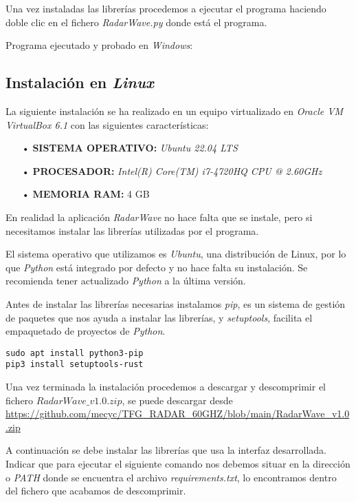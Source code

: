 
Una vez instaladas las librerías procedemos a ejecutar el programa haciendo doble clic en el fichero \textit{RadarWave.py} donde está el programa.

Programa ejecutado y probado en \textit{Windows}:


\subsection{Instalación en \textit{Linux}}

La siguiente instalación se ha realizado en un equipo virtualizado en \textit{Oracle VM VirtualBox 6.1} con las siguientes características:
\begin{itemize}
\item[•] \textbf{SISTEMA OPERATIVO:} \textit{Ubuntu 22.04 LTS}
\item[•] \textbf{PROCESADOR:} \textit{Intel(R) Core(TM) i7-4720HQ CPU @ 2.60GHz}
\item[•] \textbf{MEMORIA RAM:} 4 GB
\end{itemize}

En realidad la aplicación \textit{RadarWave} no hace falta que se instale, pero si necesitamos instalar las librerías utilizadas por el programa.

El sistema operativo que utilizamos es \textit{Ubuntu}, una distribución de {Linux}, por lo que \textit{Python} está integrado por defecto y no hace falta su instalación. Se recomienda tener actualizado \textit{Python} a la última versión.

Antes de instalar las librerías necesarias instalamos \textit{pip}, es un sistema de gestión de paquetes que nos ayuda a instalar las librerías, y \textit{setuptools}, facilita el empaquetado de proyectos de \textit{Python}.

\begin{verbatim}
sudo apt install python3-pip
pip3 install setuptools-rust
\end{verbatim}

Una vez terminada la instalación procedemos a descargar y descomprimir el fichero \textit{$RadarWave\_v1.0.zip$}, se puede descargar desde \url{https://github.com/mecyc/TFG_RADAR_60GHZ/blob/main/RadarWave_v1.0.zip}

A continuación se debe instalar las librerías que usa la interfaz desarrollada. Indicar que para ejecutar el siguiente comando nos debemos situar en la dirección o \textit{PATH} donde se encuentra el archivo \textit{requirements.txt}, lo encontramos dentro del fichero que acabamos de descomprimir.

